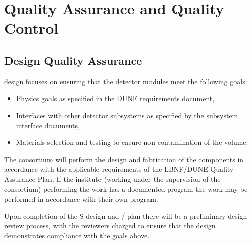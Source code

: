 \section{Quality Assurance and Quality Control}
\label{sec:fdsp-pd-qaqc}




\subsection{Design Quality Assurance}
\label{sec:fdsp-pd-designqa}

 design  focuses on ensuring that the detector modules meet the following goals:
\begin{itemize}
\item Physics goals as specified in the DUNE requirements document,
\item Interfaces with other detector subsystems as specified by the subsystem interface documents,
\item Materials selection and testing to ensure non-contamination of the \lar volume.
\end{itemize}

The  consortium will perform the design and fabrication of the components in accordance with the applicable requirements of the LBNF/DUNE Quality Assurance Plan. If the institute (working under the supervision of the consortium) performing the work has a documented  program the work may be performed in accordance with their own program.

Upon completion of the S design and / plan there will be a preliminary design review process, with the reviewers charged to ensure that the design demonstrates compliance with the goals above.

